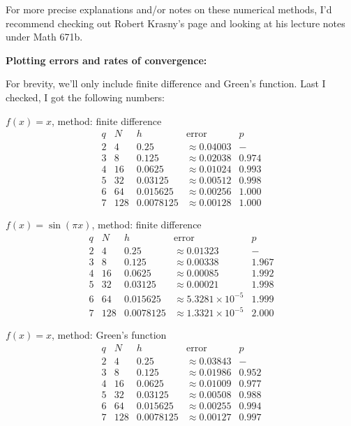 \documentclass[12pt,letterpaper]{article}
\begin{document}
    \medskip

    For more precise explanations and/or notes on these numerical methods, I'd recommend checking out Robert Krasny's page and looking at his lecture notes under Math 671b.
    
    \newpage

    \textbf{Plotting errors and rates of convergence:}

    \medskip

    For brevity, we'll only include finite difference and Green's function. Last I checked, I got the following numbers:

    \medskip

    $f(x)=x$, method: finite difference
    \[
        \begin{array}{c|c|c|c|c}
        q & N & h & \text{error} & p  \\ \hline
        2 & 4 & 0.25 & \approx 0.04003 & - \\
        3 & 8 & 0.125 & \approx0.02038 & 0.974  \\
        4 & 16 & 0.0625 & \approx0.01024 & 0.993 \\
        5 & 32 & 0.03125 & \approx 0.00512 & 0.998 \\
        6 & 64 & 0.015625 & \approx 0.00256 & 1.000  \\
        7 & 128 & 0.0078125& \approx0.00128 & 1.000 
        \end{array}
    \]

    $f(x)=\sin(\pi x)$, method: finite difference
    \[
        \begin{array}{c|c|c|c|c}
        q & N & h & \text{error} & p  \\ \hline
        2 & 4 & 0.25 & \approx 0.01323 & - \\
        3 & 8 & 0.125 & \approx0.00338 & 1.967  \\
        4 & 16 & 0.0625 & \approx0.00085 & 1.992 \\
        5 & 32 & 0.03125 & \approx 0.00021 & 1.998 \\
        6 & 64 & 0.015625 & \approx 5.3281  \times 10^{-5} & 1.999  \\
        7 & 128 & 0.0078125 & \approx 1.3321 \times 10^{-5} & 2.000 
        \end{array}
    \]

    $f(x)=x$, method: Green's function
    \[
        \begin{array}{c|c|c|c|c}
        q & N & h & \text{error} & p  \\ \hline
        2 & 4 & 0.25 & \approx 0.03843 & - \\
        3 & 8 & 0.125 & \approx0.01986 & 0.952  \\
        4 & 16 & 0.0625 & \approx0.01009 & 0.977 \\
        5 & 32 & 0.03125 & \approx 0.00508 &  0.988 \\
        6 & 64 & 0.015625 & \approx 0.00255& 0.994 \\
        7 & 128 & 0.0078125& \approx 0.00127 & 0.997 
        \end{array}
    \]
\end{document}
